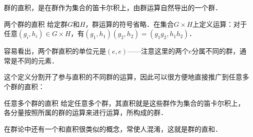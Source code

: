 
群的直积，是在群作为集合的笛卡尔积上，由群运算自然导出的一个群．

\begin{definition}{两个群的直积}
给定群$G$和$H$，群运算的符号省略．在集合$G\times H$上定义运算：对于任意$(g_i, h_i)\in G\times H$，有$(g_1, h_1)(g_2, h_2)=(g_1g_2, h_1h_2)$．
\end{definition}

容易看出，两个群直积的单位元是$(e, e)$——注意这里的两个$e$分属不同的群，通常是不同的元素．

这个定义分割开了参与直积的不同群的运算，因此可以很方便地直接推广到任意多个群的直积：

\begin{definition}{任意多个群的直积}
给定任意多个群，其直积就是这些群作为集合的笛卡尔积上，各分量按照所属的群的运算来进行运算，所构成的群．
\end{definition}

在群论中还有一个和直积很类似的概念，常使人混淆，这就是群的直和．







